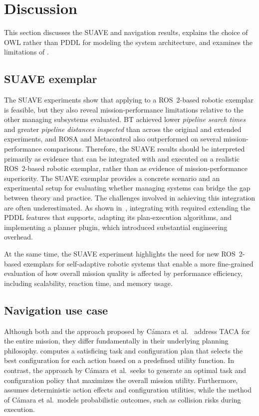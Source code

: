 \section{Discussion}\label{planta:sec:discussion}

This section discusses the SUAVE and navigation results, explains the choice of OWL rather than PDDL for modeling the system architecture, and examines the limitations of \planta.

\subsection{SUAVE exemplar}

The SUAVE experiments show that applying \planta to a ROS~2-based robotic exemplar is feasible, but they also reveal mission-performance limitations relative to the other managing subsystems evaluated. BT achieved lower \emph{pipeline search times} and greater \emph{pipeline distances inspected} than \planta across the original and extended experiments, and ROSA and Metacontrol also outperformed \planta on several mission-performance comparisons. Therefore, the SUAVE results should be interpreted primarily as evidence that \planta can be integrated with and executed on a realistic ROS~2-based robotic exemplar, rather than as evidence of mission-performance superiority. The SUAVE exemplar provides a concrete scenario and an experimental setup for evaluating whether managing systems can bridge the gap between theory and practice. The challenges involved in achieving this integration are often underestimated. As shown in~, integrating \planta with \plansys required extending the PDDL features that \plansys supports, adapting its plan-execution algorithms, and implementing a planner plugin, which introduced substantial engineering overhead.

At the same time, the SUAVE experiment highlights the need for new ROS~2-based exemplars for self-adaptive robotic systems that enable a more fine-grained evaluation of how overall mission quality is affected by performance efficiency, including scalability, reaction time, and memory usage.

\subsection{Navigation use case}\label{planta:sec:disc_nav}
Although both \planta and the approach proposed by Cámara et al.~\cite{CAMARASoftwareArchitectureTask2020} address TACA for the entire mission, they differ fundamentally in their underlying planning philosophy. \planta computes a satisficing task and configuration plan that selects the best configuration for each action based on a predefined utility function. In contrast, the approach by Cámara et al.\ seeks to generate an optimal task and configuration policy that maximizes the overall mission utility. Furthermore, \planta assumes deterministic action effects and configuration utilities, while the method of Cámara et al.\ models probabilistic outcomes, such as collision risks during execution. %


